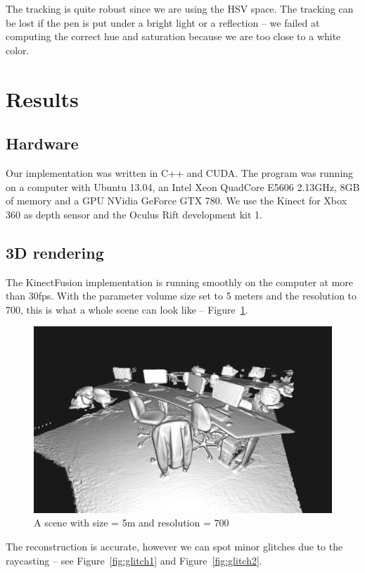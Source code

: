 \documentclass[12pt, twoside]{article}
\let\oldsection\section
\def\section{\cleardoublepage\oldsection}
\begin{document}
The tracking is quite robust since we are using the HSV space. The tracking can be lost if the pen is put under a bright light or a reflection -- we failed at computing the correct hue and saturation because we are too close to a white color.

\newpage
\section{Results}
\subsection{Hardware}
Our implementation was written in C++ and CUDA. The program was running on a computer with Ubuntu 13.04, an Intel Xeon QuadCore E5606 2.13GHz, 8GB of memory and a GPU NVidia GeForce GTX 780. We use the Kinect for Xbox 360 as depth sensor and the Oculus Rift development kit 1.
\subsection{3D rendering}
The KinectFusion implementation is running smoothly on the computer at more than 30fps. With the parameter volume size set to 5 meters and the resolution to 700, this is what a whole scene can look like -- Figure~\ref{fig:totalscene}.

\begin{figure}[!h]
  \centering
  \includegraphics[scale=0.3]{WholeScene.png}
  \caption{\label{fig:totalscene} A scene with size = 5m and resolution = 700}
\end{figure}

The reconstruction is accurate, however we can spot minor glitches due to the raycasting -- see Figure~\ref{fig:glitch1} and Figure~\ref{fig:glitch2}.
\end{document}

